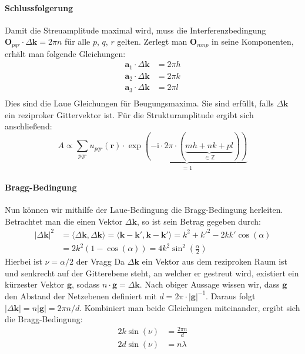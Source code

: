 \paragraph{Schlussfolgerung}
Damit die Streuamplitude maximal wird, muss die Interferenzbedingung $\mathbf{O}_{pqr}\cdot\Delta \mathbf{k} =2\pi n$
für alle $p$, $q$, $r$ gelten.
Zerlegt man $\mathbf{O}_{mnp}$ in seine Komponenten, erhält man folgende Gleichungen:
\begin{align*}
    \mathbf{a}_{1}\cdot\Delta \mathbf{k} &= 2\pi h \\
    \mathbf{a}_{2}\cdot\Delta \mathbf{k} &= 2\pi k \\
    \mathbf{a}_{3}\cdot\Delta \mathbf{k} &= 2\pi l \\
\end{align*}
Dies sind die Laue Gleichungen für Beugungsmaxima.
Sie sind erfüllt, falls $\Delta \mathbf{k}$ ein reziproker Gittervektor ist.
Für die Strukturamplitude ergibt sich anschließend:
\begin{equation*}
    A \propto \sum_{pqr} u_{pqr}(\mathbf{r}) \cdot\underbrace{ \exp(-\mathrm{i}
    \cdot2\pi\cdot(\underbrace{ mh+nk+pl }_{ \in\mathbb{Z} })) }_{ =1 }
\end{equation*}

\paragraph{Bragg-Bedingung}
Nun können wir mithilfe der Laue-Bedingung die Bragg-Bedingung herleiten.
Betrachtet man die einen Vektor $\Delta \mathbf{k}$, so ist sein Betrag gegeben durch:
\begin{align*}
    \lvert \Delta \mathbf{k} \rvert ^{2}&=\langle \Delta \mathbf{k} ,\Delta \mathbf{k}\rangle =\langle \mathbf{k}-\mathbf{k}', \mathbf{k}-\mathbf{k}' \rangle = k^{2}+k'^{2}-2kk'\cos(\alpha)  \\
    &=2{k}^{2}(1-\cos(\alpha))=4k^{2}\sin ^{2}\left( \frac{\alpha}{2} \right)
\end{align*}
Hierbei ist $\nu = \alpha / 2$ der Vragg
Da $\Delta \mathbf{k}$ ein Vektor aus dem reziproken Raum ist und senkrecht auf der Gitterebene
steht, an welcher er gestreut wird, existiert ein kürzester Vektor $\mathbf{g}$, sodass
$n\cdot \mathbf{g} =\Delta \mathbf{k}$.
Nach obiger Aussage wissen wir, dass $\mathbf{g}$ den Abstand der Netzebenen definiert
mit $d = 2 \pi \cdot\lvert \mathbf{g} \rvert ^{-1}$.
Daraus folgt $\lvert \Delta \mathbf{k} \rvert=n \lvert \mathbf{g} \rvert = 2\pi n/d$.
Kombiniert man beide Gleichungen miteinander, ergibt sich die Bragg-Bedingung:
\begin{align*}
    2k\sin(\nu)&=\frac{2\pi n}{d} \\
    2d\sin(\nu)&=n \lambda
\end{align*}

